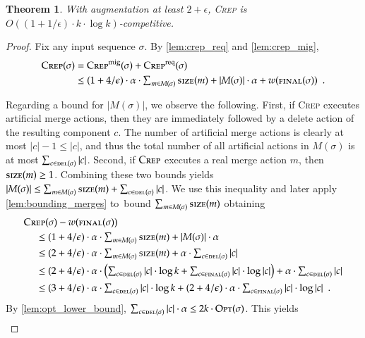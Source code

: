\documentclass[11pt,a4paper]{scrartcl}
\newtheorem{theorem}{Theorem}
\newcommand{\OPT}{\textsc{Opt}\xspace}
\newcommand{\CREP}{\textsc{Crep}\xspace}
\newcommand{\CREPreq}{\CREP^\textnormal{req}}
\newcommand{\CREPmig}{\CREP^\textnormal{mig}}
\newcommand{\eps}{\ensuremath{\epsilon}}
\newcommand{\del}{\textsc{del}}
\newcommand{\final}{\textsc{final}}
\newcommand{\size}{\textsc{size}}
\begin{document}
\begin{theorem}
With augmentation at least $2+\eps$, \CREP is~$O((1 + 1/\eps) \cdot k \cdot \log k)$-competitive.
\end{theorem}

\begin{proof}
Fix any input sequence $\sigma$. 
By \cref{lem:crep_req} and \cref{lem:crep_mig}, 
\begin{align*}
	\CREP(\sigma) 
	= &\; \CREPmig(\sigma) + \CREPreq(\sigma) \\
	\leq &\; \textstyle (1+4/\eps) \cdot \alpha \cdot \sum_{m \in M(\sigma)} \size(m) + |M(\sigma)| \cdot \alpha + w(\final(\sigma)) 
	\enspace.
\end{align*}

Regarding a bound for $|M(\sigma)|$, we observe the following. First, if \CREP
executes artificial merge actions, then they are immediately followed by a
delete action of the resulting component $c$. The number of artificial merge
actions is clearly at most $|c|-1 \leq |c|$, and thus the total number of all
artificial actions in $M(\sigma)$ is at most $\sum_{c \in \del(\sigma)} |c|$.
Second, if $\CREP$ executes a real merge action $m$, then
$\size(m) \geq 1$. Combining these two bounds yields $|M(\sigma)| \leq \sum_{m
\in M(\sigma)} \size(m) + \sum_{c \in \del(\sigma)} |c|$. We use this inequality 
and later apply \cref{lem:bounding_merges} to~bound $\sum_{m \in M(\sigma)} 
\size(m)$ obtaining
\begin{align*}
	\CREP&(\sigma) - w(\final(\sigma)) \\
  \leq &\; \textstyle (1+4/\eps) \cdot \alpha \cdot \sum_{m \in M(\sigma)} \size(m) 
    + |M(\sigma)| \cdot \alpha \\ 
	\leq &\; \textstyle (2+4/\eps) \cdot \alpha \cdot \sum_{m \in M(\sigma)} \size(m) 
		+ \alpha \cdot \sum_{c \in \del(\sigma)} |c|  \\
	\leq &\; \textstyle (2+4/\eps) \cdot \alpha \cdot \left( 
			\sum_{c \in \del(\sigma)} |c| \cdot \log k + \sum_{c \in \final(\sigma)} |c| \cdot \log |c|
			\right)
			+ \alpha \cdot \sum_{c \in \del(\sigma)} |c| \\
	\leq &\; \textstyle (3+4/\eps) \cdot \alpha \cdot 
			\sum_{c \in \del(\sigma)} |c| \cdot \log k 
			+ (2+4/\eps) \cdot \alpha \cdot
			\sum_{c \in \final(\sigma)} |c| \cdot \log |c|
	\enspace.
\end{align*}
By \cref{lem:opt_lower_bound}, $\sum_{c \in \del(\sigma)} |c| \cdot \alpha \leq 
2k \cdot \OPT(\sigma)$. This yields
\begin{align*}

\end{align*}
\end{proof}
\end{document}

